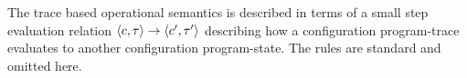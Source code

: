 %
The trace based operational semantics is described in terms of a small step evaluation relation $\langle c, \mathtt{\tau} \rangle \to \langle c', \mathtt{\tau}' \rangle$ describing how a configuration program-trace evaluates to another configuration
program-state.
The rules are standard and omitted here.


